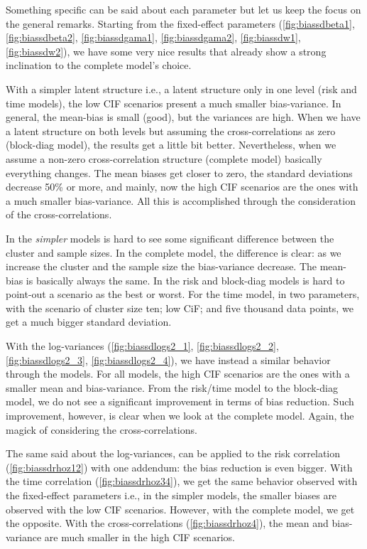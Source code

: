 Something specific can be said about each parameter but let us keep the
focus on the general remarks. Starting from the fixed-effect parameters
(\autoref{fig:biassdbeta1}, \autoref{fig:biassdbeta2},
\autoref{fig:biassdgama1}, \autoref{fig:biassdgama2},
\autoref{fig:biassdw1}, \autoref{fig:biassdw2}), we have some very nice
results that already show a strong inclination to the complete model's
choice.

With a simpler latent structure i.e., a latent structure only in one
level (risk and time models), the low CIF scenarios present a much
smaller bias-variance. In general, the mean-bias is small (good), but
the variances are high. When we have a latent structure on both levels
but assuming the cross-correlations as zero (block-diag model), the
results get a little bit better. Nevertheless, when we assume a non-zero
cross-correlation structure (complete model) basically everything
changes. The mean biases get closer to zero, the standard deviations
decrease 50\% or more, and mainly, now the high CIF scenarios are the
ones with a much smaller bias-variance. All this is accomplished through
the consideration of the cross-correlations.

In the \textit{simpler} models is hard to see some significant
difference between the cluster and sample sizes. In the complete model,
the difference is clear: as we increase the cluster and the sample size
the bias-variance decrease. The mean-bias is basically always the
same. In the risk and block-diag models is hard to point-out a scenario
as the best or worst. For the time model, in two parameters, with the
scenario of cluster size ten; low CiF; and five thousand data points, we
get a much bigger standard deviation.

With the log-variances (\autoref{fig:biassdlogs2_1},
\autoref{fig:biassdlogs2_2}, \autoref{fig:biassdlogs2_3},
\autoref{fig:biassdlogs2_4}), we have instead a similar behavior through
the models. For all models, the high CIF scenarios are the ones with a
smaller mean and bias-variance. From the risk/time model to the
block-diag model, we do not see a significant improvement in terms of
bias reduction. Such improvement, however, is clear when we look at the
complete model. Again, the magick of considering the cross-correlations.

The same said about the log-variances, can be applied to the risk
correlation (\autoref{fig:biassdrhoz12}) with one addendum: the bias
reduction is even bigger. With the time correlation
(\autoref{fig:biassdrhoz34}), we get the same behavior observed with the
fixed-effect parameters i.e., in the simpler models, the smaller biases
are observed with the low CIF scenarios. However, with the complete
model, we get the opposite. With the cross-correlations
(\autoref{fig:biassdrhoz4}), the mean and bias-variance are much smaller
in the high CIF scenarios.

